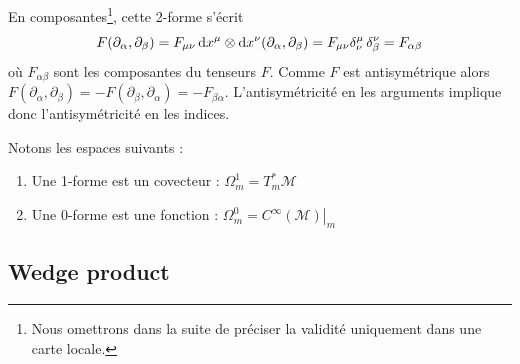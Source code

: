En composantes\footnote{Nous omettrons dans la suite de préciser la validité uniquement dans une carte locale.}, cette 2-forme s'écrit
\begin{equation}
    F(\partial_{\alpha}, \partial_{\beta}) = F_{\mu \nu}\, \mathrm{d} x^{\mu}\otimes \mathrm{d} x^{\nu}(\partial_{\alpha}, \partial_{\beta}) = F_{\mu \nu} \delta^{\mu}_{\nu}\,\delta^{\nu}_{\beta } = F_{\alpha \beta}
\end{equation}
où $F_{\alpha \beta}$ sont les composantes du tenseurs $F$. Comme $F$ est antisymétrique alors $F(\partial_{\alpha}, \partial_{\beta}) = -F(\partial_{\beta}, \partial_{\alpha}) = -F_{ \beta \alpha}$. L'antisymétricité en les arguments implique donc l'antisymétricité en les indices.
\begin{rmk}
    Notons les espaces suivants :
    \begin{enumerate}
        \item Une 1-forme est un covecteur : $\Omega_m^1 = T_m^*\mathcal{M}$
        \item Une 0-forme est une fonction : $\Omega_m^0 = \left. C^\infty(\mathcal{M}) \right|_m$
    \end{enumerate}
\end{rmk}

\subsection{Wedge product}

